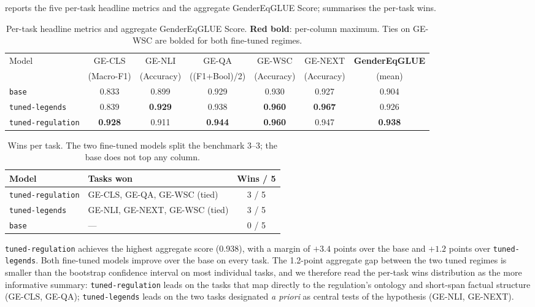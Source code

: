 \documentclass[pdflatex, sn-apa]{sn-jnl}%
\theoremstyle{thmstyleone}%
\theoremstyle{thmstyletwo}%
\theoremstyle{thmstylethree}%
\newcommand{\best}[1]{\textcolor{bestred}{\textbf{#1}}}
\newcommand{\modelbase}{\texttt{base}}
\newcommand{\modellegends}{\texttt{tuned-legends}}
\newcommand{\modelreg}{\texttt{tuned-regulation}}
\begin{document}
 reports the five per-task headline metrics and the
aggregate GenderEqGLUE Score;  summarises the per-task
wins.

\begin{table}[h]
\centering
\caption{Per-task headline metrics and aggregate GenderEqGLUE Score.
\best{Red bold}: per-column maximum. Ties on GE-WSC are bolded for both
fine-tuned regimes.}
\label{tab:headline}
\small
\begin{tabular}{@{}lcccccc@{}}
\toprule
Model            & GE-CLS         & GE-NLI         & GE-QA          & GE-WSC         & GE-NEXT        & \textbf{GenderEqGLUE} \\
                 & (Macro-F1)     & (Accuracy)     & ((F1+Bool)/2)  & (Accuracy)     & (Accuracy)     & (mean)                \\
\midrule
\modelbase       & 0.833          & 0.899          & 0.929          & 0.930          & 0.927          & 0.904                 \\
\modellegends    & 0.839          & \best{0.929}   & 0.938          & \best{0.960}   & \best{0.967}   & 0.926                 \\
\modelreg        & \best{0.928}   & 0.911          & \best{0.944}   & \best{0.960}   & 0.947          & \best{0.938}          \\
\bottomrule
\end{tabular}
\end{table}

\begin{table}[h]
\centering
\caption{Wins per task. The two fine-tuned models split the benchmark
3--3; the base does not top any column.}
\label{tab:wins}
\small
\begin{tabular}{@{}llc@{}}
\toprule
Model            & Tasks won                                         & Wins / 5 \\
\midrule
\modelreg        & GE-CLS, GE-QA, GE-WSC (tied)                      & 3 / 5    \\
\modellegends    & GE-NLI, GE-NEXT, GE-WSC (tied)                    & 3 / 5    \\
\modelbase       & ---                                               & 0 / 5    \\
\bottomrule
\end{tabular}
\end{table}

\modelreg{} achieves the highest aggregate score (0.938), with a margin
of $+3.4$ points over the base and $+1.2$ points over \modellegends.
Both fine-tuned models improve over the base on every task. The 1.2-point
aggregate gap between the two tuned regimes is smaller than the
bootstrap confidence interval on most individual tasks, and we therefore
read the per-task wins distribution as the more informative summary:
\modelreg{} leads on the tasks that map directly to the regulation's
ontology and short-span factual structure (GE-CLS, GE-QA);
\modellegends{} leads on the two tasks designated \emph{a priori} as
central tests of the hypothesis (GE-NLI, GE-NEXT).
\end{document}
